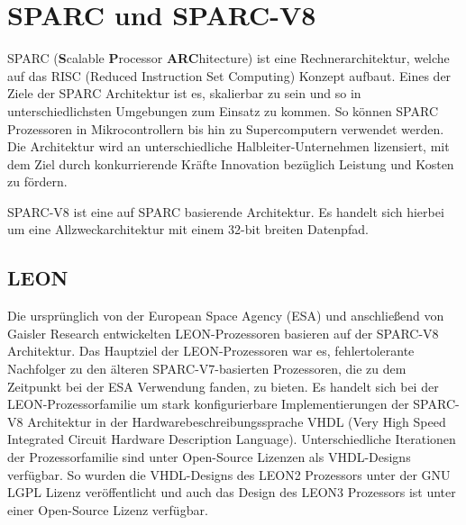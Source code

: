 



\section{SPARC und SPARC-V8}

SPARC (\textbf{S}calable \textbf{P}rocessor \textbf{ARC}hitecture) ist eine Rechnerarchitektur, welche auf das
RISC (Reduced Instruction Set Computing) Konzept aufbaut. Eines der Ziele der SPARC Architektur ist es, skalierbar
zu sein und so in unterschiedlichsten Umgebungen zum Einsatz zu kommen. So können SPARC Prozessoren in
Mikrocontrollern bis hin zu Supercomputern verwendet werden. Die Architektur wird an unterschiedliche
Halbleiter-Unternehmen lizensiert, mit dem Ziel durch konkurrierende Kräfte Innovation bezüglich Leistung und
Kosten zu fördern.\cite{sparc}

SPARC-V8 ist eine auf SPARC basierende Architektur. Es handelt sich hierbei um eine Allzweckarchitektur mit einem
32-bit breiten Datenpfad.\cite{sparcv8Eval}

\subsection{LEON}

Die ursprünglich von der European Space Agency (ESA) und anschließend von Gaisler Research entwickelten
LEON-Prozessoren basieren auf der SPARC-V8 Architektur.
Das Hauptziel der LEON-Prozessoren war es, fehlertolerante Nachfolger zu den älteren SPARC-V7-basierten
Prozessoren, die zu dem Zeitpunkt bei der ESA Verwendung fanden, zu bieten.\cite{gaislerLeon}
Es handelt sich bei der LEON-Prozessorfamilie um stark konfigurierbare
Implementierungen der SPARC-V8 Architektur in der Hardwarebeschreibungssprache
VHDL (Very High Speed Integrated Circuit Hardware Description Language).
Unterschiedliche Iterationen der Prozessorfamilie sind unter Open-Source Lizenzen als VHDL-Designs verfügbar.
So wurden die VHDL-Designs des LEON2 Prozessors unter der GNU LGPL Lizenz veröffentlicht\cite{sparcv8Eval} und
auch das Design des LEON3 Prozessors ist unter einer Open-Source Lizenz verfügbar\cite{invasiveArrays}.

